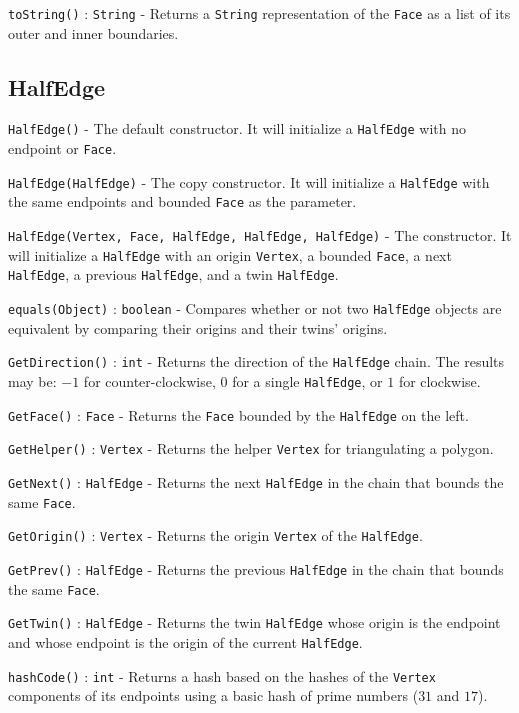 \documentclass[11pt]{article}
\begin{document}
	\texttt{toString()} : \texttt{String} - Returns a \texttt{String} representation of the \texttt{Face} as a list of its outer and inner boundaries.

\subsection{HalfEdge}
\label{sec:halfedge}

	\texttt{HalfEdge()} - The default constructor. It will initialize a \texttt{HalfEdge} with no endpoint or \texttt{Face}.
	
	\texttt{HalfEdge(HalfEdge)} - The copy constructor. It will initialize a \texttt{HalfEdge} with the same endpoints and bounded \texttt{Face} as the parameter.
	
	\texttt{HalfEdge(Vertex, Face, HalfEdge, HalfEdge, HalfEdge)} - The constructor. It will initialize a \texttt{HalfEdge} with an origin \texttt{Vertex}, a bounded \texttt{Face}, a next \texttt{HalfEdge}, a previous \texttt{HalfEdge}, and a twin \texttt{HalfEdge}.
	 
	\texttt{equals(Object)} : \texttt{boolean} - Compares whether or not two \texttt{HalfEdge} objects are equivalent by comparing their origins and their twins' origins.
	
	\texttt{GetDirection()} : \texttt{int} - Returns the direction of the \texttt{HalfEdge} chain. The results may be: $-1$ for counter-clockwise, $0$ for a single \texttt{HalfEdge}, or $1$ for clockwise.
	
	\texttt{GetFace()} : \texttt{Face} - Returns the \texttt{Face} bounded by the \texttt{HalfEdge} on the left.
	
	\texttt{GetHelper()} : \texttt{Vertex} - Returns the helper \texttt{Vertex} for triangulating a polygon.
	
	\texttt{GetNext()} : \texttt{HalfEdge} - Returns the next \texttt{HalfEdge} in the chain that bounds the same \texttt{Face}.
	
	\texttt{GetOrigin()} : \texttt{Vertex} - Returns the origin \texttt{Vertex} of the \texttt{HalfEdge}.
	
	\texttt{GetPrev()} : \texttt{HalfEdge} - Returns the previous \texttt{HalfEdge} in the chain that bounds the same \texttt{Face}.
	
	\texttt{GetTwin()} : \texttt{HalfEdge} - Returns the twin \texttt{HalfEdge} whose origin is the endpoint and whose endpoint is the origin of the current \texttt{HalfEdge}.
	
	\texttt{hashCode()} : \texttt{int} - Returns a hash based on the hashes of the \texttt{Vertex} components of its endpoints using a basic hash of prime numbers ($31$ and $17$).
	
\end{document}
